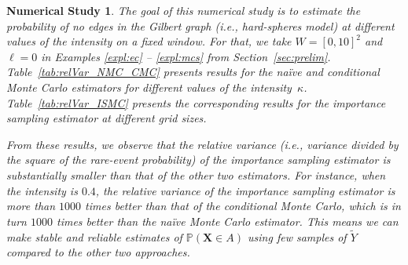 \documentclass[pdflatex, sn-mathphys-ay]{sn-jnl}%
\renewcommand{\v}[1]{\boldsymbol{#1}}
\newcommand{\pp}{\mathbb{P}}
\newcommand{\mX}{\v{X}}
\newcommand{\wt}{\widetilde}
\newtheorem{experiment}{Numerical Study}
\theoremstyle{thmstyleone}%
\theoremstyle{thmstyletwo}%
\theoremstyle{thmstylethree}%
\begin{document}
\begin{experiment} 
\label{exper-1}
\normalfont
The goal of this numerical study is to estimate the probability of no edges in the Gilbert graph (i.e., hard-spheres model) at different values of the intensity on a fixed window. For that, we take $W = [0,10]^2$ and $\ell = 0$ in Examples {\ref{expl:ec} -- \ref{expl:mcs}} from Section~\ref{sec:prelim}. Table~\ref{tab:relVar_NMC_CMC} presents results for the na\"{i}ve and conditional Monte Carlo estimators for different values of the intensity~$\kappa$. Table~\ref{tab:relVar_ISMC} presents the corresponding results for the importance sampling estimator at different grid sizes.

From these results, we observe that the relative variance (i.e., variance divided by the square of the rare-event probability) of the importance sampling estimator is substantially smaller than that of the other two estimators. For instance, when the intensity is $0.4$, the relative variance of the importance sampling estimator is more than $1000$ times better than that of the conditional Monte Carlo, which is in turn $1000$ times better than the na\"{i}ve Monte Carlo estimator. This means we can make stable and reliable estimates of $\pp(\mX \in A)$ using few samples of $\wt Y$ compared to the other two approaches.


\end{experiment}
\end{document}
